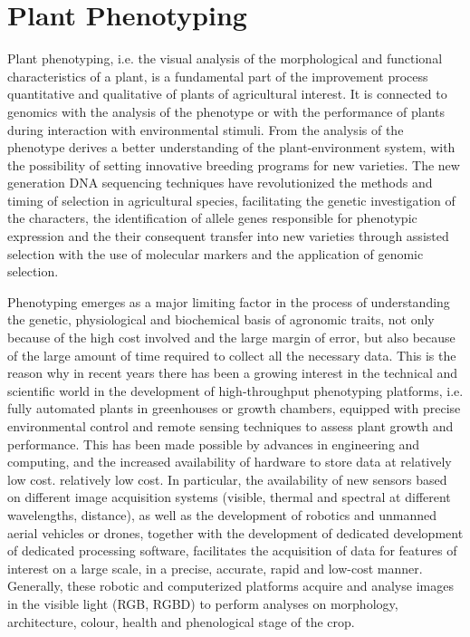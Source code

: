 


\section{Plant Phenotyping} %
Plant phenotyping, i.e. the visual analysis of the morphological and functional characteristics of a plant, is a fundamental part of the improvement process
quantitative and qualitative of plants of agricultural interest. It is connected to genomics with the analysis of the phenotype or with the performance of plants during
interaction with environmental stimuli. From the analysis of the phenotype derives a better understanding of the plant-environment system, with the possibility of setting
innovative breeding programs for new varieties. The new generation DNA sequencing techniques have revolutionized the methods and timing of selection in agricultural
species, facilitating the genetic investigation of the characters, the identification of allele genes responsible for phenotypic expression and the
their consequent transfer into new varieties through assisted selection with the use of molecular markers and the application of genomic selection.

Phenotyping emerges as a major limiting factor in the process of understanding the genetic, physiological and biochemical basis of agronomic traits, not only because of
the high cost involved and the large margin of error, but also because of the large amount of time required to collect all the necessary data. This is the reason why
in recent years there has been a growing interest in the technical and scientific world in the development of high-throughput phenotyping platforms, i.e. fully
automated plants in greenhouses or growth chambers, equipped with precise environmental control and remote sensing techniques to assess plant growth and performance.
This has been made possible by advances in engineering and computing, and the increased availability of hardware to store data at relatively low cost. relatively low
cost. In particular, the availability of new sensors based on different image acquisition systems (visible, thermal and spectral at different wavelengths, distance),
as well as the development of robotics and unmanned aerial vehicles or drones, together with the development of dedicated development of dedicated processing software,
facilitates the acquisition of data for features of interest on a large scale, in a precise, accurate, rapid and low-cost manner. Generally, these robotic and computerized
platforms acquire and analyse images in the visible light (RGB, RGBD) to perform analyses on morphology, architecture, colour, health and phenological stage of the crop.


